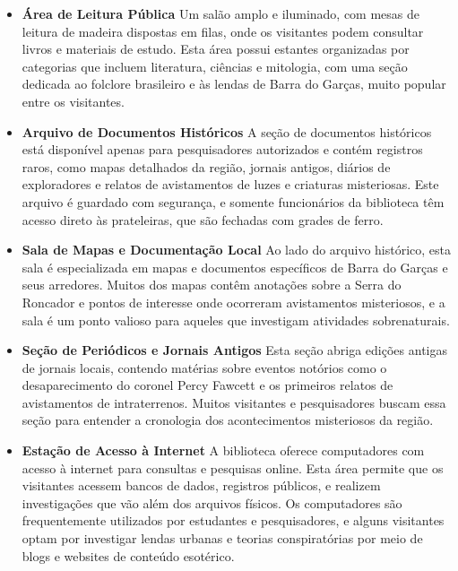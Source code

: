 \begin{itemize}
    \item \textbf{Área de Leitura Pública}  
    Um salão amplo e iluminado, com mesas de leitura de madeira dispostas em filas, onde os visitantes podem consultar livros e materiais de estudo. Esta área possui estantes organizadas por categorias que incluem literatura, ciências e mitologia, com uma seção dedicada ao folclore brasileiro e às lendas de Barra do Garças, muito popular entre os visitantes.

    \item \textbf{Arquivo de Documentos Históricos}  
    A seção de documentos históricos está disponível apenas para pesquisadores autorizados e contém registros raros, como mapas detalhados da região, jornais antigos, diários de exploradores e relatos de avistamentos de luzes e criaturas misteriosas. Este arquivo é guardado com segurança, e somente funcionários da biblioteca têm acesso direto às prateleiras, que são fechadas com grades de ferro.

    \item \textbf{Sala de Mapas e Documentação Local}  
    Ao lado do arquivo histórico, esta sala é especializada em mapas e documentos específicos de Barra do Garças e seus arredores. Muitos dos mapas contêm anotações sobre a Serra do Roncador e pontos de interesse onde ocorreram avistamentos misteriosos, e a sala é um ponto valioso para aqueles que investigam atividades sobrenaturais.

    \item \textbf{Seção de Periódicos e Jornais Antigos}  
    Esta seção abriga edições antigas de jornais locais, contendo matérias sobre eventos notórios como o desaparecimento do coronel Percy Fawcett e os primeiros relatos de avistamentos de intraterrenos. Muitos visitantes e pesquisadores buscam essa seção para entender a cronologia dos acontecimentos misteriosos da região.

    \item \textbf{Estação de Acesso à Internet}  
    A biblioteca oferece computadores com acesso à internet para consultas e pesquisas online. Esta área permite que os visitantes acessem bancos de dados, registros públicos, e realizem investigações que vão além dos arquivos físicos. Os computadores são frequentemente utilizados por estudantes e pesquisadores, e alguns visitantes optam por investigar lendas urbanas e teorias conspiratórias por meio de blogs e websites de conteúdo esotérico.
\end{itemize}


